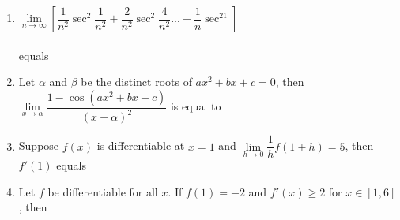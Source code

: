 \documentclass[journal,12pt,twocolumn]{IEEEtran}
\begin{document}
\begin{enumerate}
\item $\lim\limits_{n \to \infty}\left[\dfrac{1}{n^2}\sec^2\dfrac{1}{n^2}+\dfrac{2}{n^2}\sec^2\dfrac{4}{n^2}...+\dfrac{1}{n}\sec^21\right]$ \\ \\equals
\begin{itemize}
\end{itemize}

\item Let $\alpha$ and $\beta$ be the distinct roots of $ax^2+bx+c=0$, then $\lim\limits_{x \to \alpha}\dfrac{1-\cos(ax^2+bx+c)}{(x-\alpha)^2}$ is equal to
\begin{itemize}
\end{itemize}

\item Suppose $f(x)$ is differentiable at $x=1$ and $\lim\limits_{h \to 0}\dfrac{1}{h}f(1+h)=5$, then $f'(1)$ equals
\begin{itemize}
\end{itemize}

\item Let $f$ be differentiable for all $x$. If $f(1)=-2$ and $f'(x)\geq 2$ for $x \in [1,6]$, then
\begin{itemize}
\end{itemize}


\end{enumerate}
\end{document}
